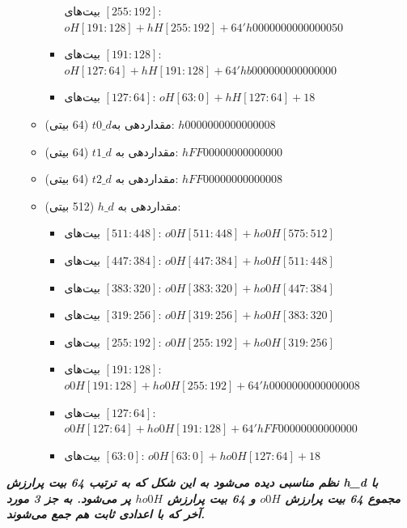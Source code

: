 \begin{itemize}
\begin{itemize}
\begin{itemize}
	      	      	      بیت‌های $[255:192]$:
	      	      	      $	oH[191:128] + hH[255:192] + 
	      	      	      64'h0000000000000050$
	      	      	\item
	      	      	      بیت‌های $[191:128]$:	
	      	      	      $oH[127: 64] + hH[191:128] + 64'hb000000000000000$
	      	      	\item
	      	      	      بیت‌های $[127:64]$:
	      	      	  $    	oH[ 63:  0] + hH[127: 64] + 18$
	      	      \end{itemize}
	      	\item
	      	      مقداردهی به$ t0\_d$ (64 بیتی): $h0000000000000008$
	      	\item
	      	      مقداردهی به $t1\_d$ (64 بیتی): $hFF00000000000000$
	      	\item
	      	      مقداردهی به $t2\_d$ (64 بیتی): $hFF00000000000008$
	      	\item
	      	      مقداردهی به $h\_d$ (512 بیتی):
	      	      \begin{itemize}
	      	      	\item
	      	      	      بیت‌های $[511:448]$:
	      	      	      $ 	o0H[511:448] + ho0H[575:512]$
      	      	    \item
	      	      	      بیت‌های $[447:384]$:  
	      	      	      	$o0H[447:384] + ho0H[511:448]$
	      	      	\item
	      	      	      بیت‌های $[383:320]$:
	      	      	      $	o0H[383:320] + ho0H[447:384]$
	      	      	\item
	      	      	      بیت‌های $[319:256]$:
	      	      	      $	o0H[319:256] + ho0H[383:320]$
	      	      	\item
	      	      	      بیت‌های $[255:192]$:
	      	      	      $	o0H[255:192] + ho0H[319:256]$
	      	      	\item
	      	      	      بیت‌های $[191:128]$:	
	      	      	      $o0H[191:128] + ho0H[255:192] + 64'h0000000000000008$
	      	      	\item
	      	      	      بیت‌های $[127:64]$:	
	      	      	      $o0H[127: 64] + ho0H[191:128] + 64'hFF00000000000000$
	      	      	\item
	      	      	      بیت‌های $[63:0]$:	
	      	      	      $	o0H[ 63:  0] + ho0H[127: 64] + 18$
	      	      	 
	      	      \end{itemize}
	      \end{itemize}
\end{itemize}
\textit{
	\textbf{نظم مناسبی دیده می‌شود به این شکل که به ترتیب 64 بیت پرارزش h\_d با مجموع 64 بیت پرارزش $o0H$ و 64 بیت پرارزش $ho0H$ پر می‌شود. به جز 3 مورد آخر که با اعدادی ثابت هم جمع می‌شوند.
}}\\

